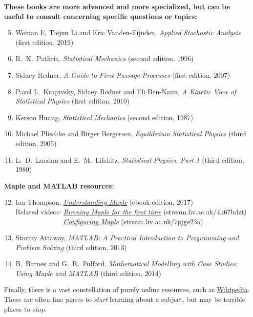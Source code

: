 \noindent\textbf{These books are more advanced and more specialized, but can be useful to consult concerning specific questions or topics:} \\[-24 pt]
\begin{enumerate}
  \setcounter{enumi}{4}
  \item Weinan E, Tiejun Li and Eric Vanden-Eijnden, \textit{Applied Stochastic Analysis} (first edition, 2019)
  \item R.~K.~Pathria, \textit{Statistical Mechanics} (second edition, 1996)
  \item Sidney Redner, \textit{A Guide to First-Passage Processes} (first edition, 2007)
  \item Pavel L.~Krapivsky, Sidney Redner and Eli Ben-Naim, \textit{A Kinetic View of Statistical Physics} (first edition, 2010)
  \item Kerson Huang, \textit{Statistical Mechanics} (second edition, 1987)
  \item Michael Plischke and Birger Bergersen, \textit{Equilibrium Statistical Physics} (third edition, 2005)
  \item L.~D.~Landau and E.~M.~Lifshitz, \textit{Statistical Physics, Part 1} (third edition, 1980)
\end{enumerate}

\noindent\textbf{Maple and MATLAB resources:} \\[-24 pt]
\begin{enumerate}
  \setcounter{enumi}{11}
  \item Ian Thompson, \href{https://library.liv.ac.uk/record=b4395758~S8}{\textit{Understanding Maple}} (ebook edition, 2017) \\
        Related videos: \href{https://stream.liv.ac.uk/4k67bdzt}{\textit{Running Maple for the first time}} (stream.liv.ac.uk/4k67bdzt) \\
        \textcolor{white}{Related videos:} \href{https://stream.liv.ac.uk/7pjge23a}{\textit{Configuring Maple}} (stream.liv.ac.uk/7pjge23a)
  \item Stormy Attaway, \textit{MATLAB: A Practical Introduction to Programming and Problem Solving} (third edition, 2013)
  \item B.~Barnes and G.~R.~Fulford, \textit{Mathematical Modelling with Case Studies: Using Maple and MATLAB} (third edition, 2014)
\end{enumerate}

Finally, there is a vast constellation of purely online resources, such as \href{https://en.wikipedia.org/wiki/Statistical_physics}{Wikipedia}.
These are often fine places to \emph{start} learning about a subject, but may be terrible places to \emph{stop}.
